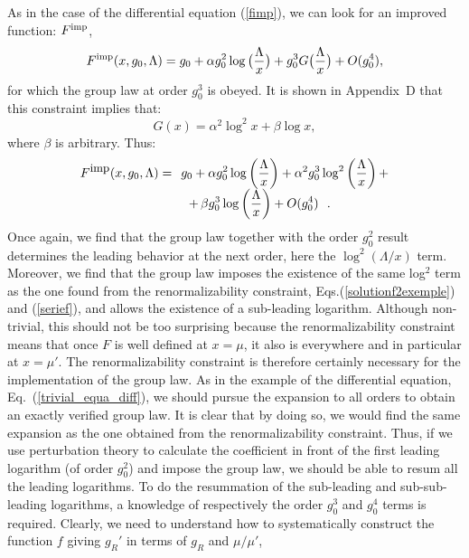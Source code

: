 \documentclass[floatfix,twocolumn,preprintnumbers,amsmath,amssymb,prb]{revtex4}
\newcommand{\be}{\begin{equation}}
\newcommand{\ee}{\end{equation}}
\begin{document}
As in the case of the differential equation (\ref{fimp}),
we can look for an improved function: $F^{\rm imp}$,
\begin{equation}
F^{\rm imp}(x,g_0,\Lambda)=g_0 + \alpha g_0^2
\log\big(\frac{\Lambda}{x}\big) + g_0^3
G\big(\frac{\Lambda}{x}\big)+ O(g_0^4),
\end{equation}
for which the group law at order $g_0^3$ is obeyed. It is shown
in Appendix~D that this constraint implies that:
\begin{equation}
G(x)=\alpha^2 \log^2x +\beta \log x,
\label{equation_G}
\end{equation}
where $\beta$ is arbitrary. Thus:
\be
\begin{array}{ll}
\displaystyle{F^{\small\mbox{imp}}(x,g_0,\Lambda)}=& \hspace{-0.1cm}g_0 +\displaystyle{ \alpha g_0^2 \log\left(\frac{\Lambda}{x}\right) + 
\alpha^2 g_0^3 \log^2\left(\frac{\Lambda}{x}\right)+} \\
&\ +\,\displaystyle{\beta g_0^3 \log\left(\frac{\Lambda}{x}\right) +O(g_0^4)}\ \ .
\end{array}
\ee
Once again, we find that the group law together with the order
$g_0^2$ result determines the leading behavior at the next order,
here the $\log^2 (\Lambda/x)$ term. Moreover,
we find that the group law imposes the existence of the same
log$^2$ term as the one found from the renormalizability
constraint, Eqs.(\ref{solutionf2exemple}) and (\ref{serief}), and
allows the existence of a sub-leading logarithm. Although
non-trivial, this should not be too surprising because the
renormalizability constraint means that once $F$ is well defined
at $x=\mu$, it also is everywhere and in particular at $x=\mu'$.
The renormalizability constraint is therefore certainly necessary for the
implementation of the group law. As in the example of the
differential equation, Eq.~(\ref{trivial_equa_diff}), we should
pursue the expansion to all orders to obtain an exactly verified
group law. It is clear that by doing so, we would find the same
expansion as the one obtained from the renormalizability
constraint. Thus, if we use perturbation theory to calculate the
coefficient in front of the 
first leading logarithm (of order $g_0^2$) and impose the group
law, we should be able to resum all the leading logarithms. To do
the resummation of the sub-leading and sub-sub-leading logarithms,
a knowledge of respectively the order $g_0^3$ and $g_0^4$ terms
is required. Clearly, we need to understand how
to systematically construct the function
$f$ giving
$g_R'$ in terms of $g_R$ and $\mu/\mu'$,\cite{shirkov01}
\end{document}
